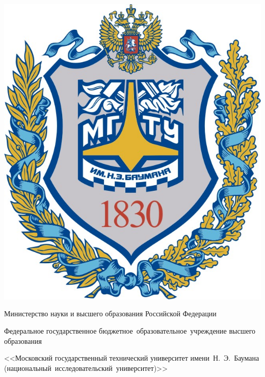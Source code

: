 \begin{titlepage}
    \begin{center}
        \fontsize{12pt}{12pt}\selectfont

        \fbox
        {
            \begin{minipage}{0.15\textwidth}
                \includegraphics[width=\linewidth]{img/bmstu_logo.jpg}
            \end{minipage}
            \hfill

            \vrule
            \hspace{0.2cm}

            \begin{minipage}{0.80\textwidth}\centering\bfseries
                {
                    \linespread{1}\selectfont
                    {Министерство науки и высшего образования Российской Федерации}

                    {Федеральное государственное бюджетное~образовательное~учреждение высшего образования}

                    {<<Московский государственный технический университет имени~Н.~Э.~Баумана (национальный~исследовательский~университет)>>}

}
\end{minipage}}
\end{center}
\end{titlepage}

